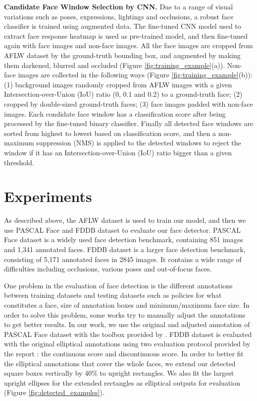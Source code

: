\documentclass[10pt,twocolumn,letterpaper]{article}
\begin{document}
{\bf Candidate Face Window Selection by CNN.} Due to a range of visual variations such as poses, expressions, lightings and occlusions, a robust face classifier is trained using augmented data. The fine-tuned CNN model used to extract face response heatmap is used as pre-trained model, and then fine-tuned again with face images and non-face images. All the face images are cropped from AFLW dataset \cite{kostinger2011annotated} by the ground-truth bounding box, and augmented by making them darkened, blurred and occluded (Figure \ref{fig:training_example}(a)). Non-face images are collected in the following ways (Figure \ref{fig:training_example}(b)): (1) background images randomly cropped from AFLW images with a given Intersection-over-Union (IoU) ratio (0, 0.1 and 0.2) to a ground-truth face; (2) cropped by double-sized ground-truth faces; (3) face images padded with non-face images. Each condidate face window has a classification score after being processed by the fine-tuned binary classifier. Finally all detected face windows are sorted from highest to lowest based on classification score, and then a non-maximum suppression (NMS) is applied to the detected windows to reject the window if it has an Intersection-over-Union (IoU) ratio bigger than a given threshold.


\section{Experiments}
As described above, the AFLW dataset is used to train our model, and then we use PASCAL Face \cite{yan2014face} and FDDB dataset \cite{fddbTech} to evaluate our face detector. PASCAL Face dataset is a widely used face detection benchmark, containing 851 images and 1,341 annotated faces. FDDB dataset is a larger face detection benchmark, consisting of 5,171 annotated faces in 2845 images. It contains a wide range of difficulties including occlusions, various poses and out-of-focus faces.

One problem in the evaluation of face detection is the different annotations between training datasets and testing datasets such as policies for what constitutes a face, size of annotation boxes and minimum/maximum face size. In order to solve this problem, some works \cite{li2015convolutional,mathias2014face, yang2014aggregate} try to manually adjust the annotations to get better results. In our work, we use the original and adjusted annotation \cite{mathias2014face} of PASCAL Face dataset with the toolbox provided by \cite{mathias2014face}. FDDB dataset is evaluated with the original elliptical annotations using two evaluation protocol provided by the report \cite{fddbTech}: the continuous score and discontinuous score. In order to better fit the elliptical annotations that cover the whole faces, we extend our detected square boxes vertically by 40\% to upright rectangles. We also fit the largest upright ellipses for the extended rectangles as elliptical outputs for evaluation (Figure \ref{fig:detected_examples}).
\end{document}
